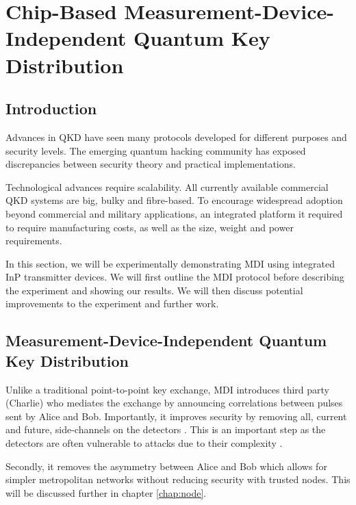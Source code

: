 %
%
\graphicspath{{./chapters/chapter04/fig04/}}

\let\textcircled=\pgftextcircled
\chapter[Chip-Based Measurement-Device-Independent QKD]{Chip-Based Measurement-Device-Independent Quantum Key Distribution}
\label{chap:mdiqkd}

\section*{Introduction}

Advances in \ac{QKD} have seen many protocols developed for different purposes and security levels. The emerging quantum hacking community has exposed discrepancies between security theory and practical implementations. 

Technological advances require scalability. All currently available commercial \ac{QKD} systems are big, bulky and fibre-based. To encourage widespread adoption beyond commercial and military applications, an integrated platform it required to require manufacturing costs, as well as the size, weight and power requirements.

In this section, we will be experimentally demonstrating \ac{MDI} \cite{mdi-qkd} using integrated \ac{InP} transmitter devices. We will first outline the \ac{MDI} protocol before describing the experiment and showing our results. We will then discuss potential improvements to the experiment and further work.

\section{Measurement-Device-Independent Quantum Key Distribution}
\label{sec:mdi-qkd}

Unlike a traditional point-to-point key exchange, \ac{MDI} introduces third party (Charlie) who mediates the exchange by announcing correlations between pulses sent by Alice and Bob. Importantly, it improves security by removing all, current and future, side-channels on the detectors \cite{}. This is an important step as the detectors are often vulnerable to attacks due to their complexity \cite{}.

Secondly, it removes the asymmetry between Alice and Bob which allows for simpler metropolitan networks without reducing security with trusted nodes. This will be discussed further in chapter \ref{chap:node}.

